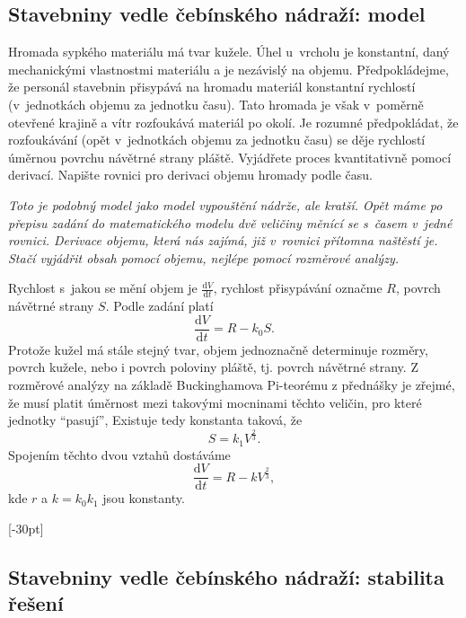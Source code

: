 \konec


\stranka



\subsection{Stavebniny vedle čebínského nádraží: model} Hromada sypkého
materiálu má tvar kužele. Úhel u~vrcholu je konstantní, daný
mechanickými vlastnostmi materiálu a je nezávislý na
objemu. Předpokládejme, že personál stavebnin přisypává na hromadu
materiál konstantní rychlostí (v jednotkách objemu za jednotku
času). Tato hromada je však v poměrně otevřené krajině a vítr
rozfoukává materiál po okolí. Je rozumné předpokládat, že rozfoukávání (opět v jednotkách objemu za jednotku
času)
se děje rychlostí úměrnou povrchu návětrné strany pláště. Vyjádřete proces kvantitativně pomocí derivací.
Napište rovnici pro derivaci objemu hromady podle času. 

\textit{Toto je podobný model jako model vypouštění nádrže, ale kratší. Opět máme po přepisu zadání do matematického modelu dvě veličiny měnící se s časem v jedné rovnici. Derivace objemu, která nás zajímá, již v rovnici přítomna naštěstí je. Stačí vyjádřit obsah pomocí objemu, nejlépe pomocí rozměrové analýzy.}

\reseni
Rychlost s jakou se mění objem je $\frac{\mathrm dV}{\mathrm dt}$, rychlost přisypávání označme $R$, povrch návětrné strany $S$.
Podle zadání platí
$$  \frac{\mathrm dV}{\mathrm dt} = R - k_0S.$$
Protože kužel má stále stejný tvar, objem jednoznačně determinuje rozměry, povrch kužele, nebo i povrch poloviny pláště, tj. povrch návětrné strany. Z rozměrové analýzy na základě Buckinghamova Pi-teorému z přednášky je zřejmé, že musí platit úměrnost mezi takovými mocninami těchto veličin, pro které jednotky ``pasují'', Existuje tedy konstanta taková, že $$S=k_1V^{\frac 23}.$$ Spojením těchto dvou vztahů dostáváme
$$  \frac{\mathrm dV}{\mathrm dt} = R - k V^{\frac 23},$$
kde $r$ a $k=k_0k_1$ jsou konstanty.

\konec




[-30pt]

\subsection{Stavebniny vedle čebínského nádraží: stabilita řešení}

